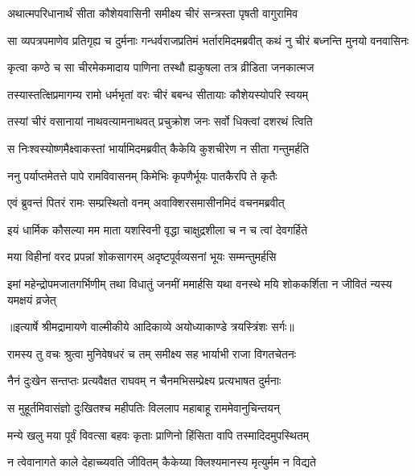\twolineshloka
{अथात्मपरिधानार्थं सीता कौशेयवासिनी}
{समीक्ष्य चीरं सन्त्रस्ता पृषती वागुरामिव} %

\threelineshloka
{सा व्यपत्रपमाणेव प्रतिगृह्य च दुर्मनाः}
{गन्धर्वराजप्रतिमं भर्तारमिदमब्रवीत्}
{कथं नु चीरं बध्नन्ति मुनयो वनवासिनः} %

\twolineshloka
{कृत्वा कण्ठे च सा चीरमेकमादाय पाणिना}
{तस्थौ ह्यकुषला तत्र व्रीडिता जनकात्मज} %

\twolineshloka
{तस्यास्तत्क्षिप्रमागम्य रामो धर्मभृतां वरः}
{चीरं बबन्ध सीतायाः कौशेयस्योपरि स्वयम्} %

\twolineshloka
{तस्यां चीरं वसानायां नाथवत्यामनाथवत्}
{प्रचुक्रोश जनः सर्वो धिक्त्वां दशरथं त्विति} %

\twolineshloka
{स निःश्वस्योष्णमैक्ष्वाकस्तां भार्यामिदमब्रवीत्}
{कैकेयि कुशचीरेण न सीता गन्तुमर्हति} %

\twolineshloka
{ननु पर्याप्तमेतत्ते पापे रामविवासनम्}
{किमेभिः कृपणैर्भूयः पातकैरपि ते कृतैः} %

\twolineshloka
{एवं ब्रुवन्तं पितरं रामः सम्प्रस्थितो वनम्}
{अवाक्शिरसमासीनमिदं वचनमब्रवीत्} %

\twolineshloka
{इयं धार्मिक कौसल्या मम माता यशस्विनी}
{वृद्धा चाक्षुद्रशीला च न च त्वां देवगर्हिते} %

\twolineshloka
{मया विहीनां वरद प्रपन्नां शोकसागरम्}
{अदृष्टपूर्वव्यसनां भूयः सम्मन्तुमर्हसि} %

\fourlineindentedshloka
{इमां महेन्द्रोपमजातगर्भिणीम्}
{तथा विधातुं जनमीं ममार्हसि}
{यथा वनस्थे मयि शोककर्शिता}
{न जीवितं न्यस्य यमक्षयं व्रजेत्} %


{॥इत्यार्षे श्रीमद्रामायणे वाल्मीकीये आदिकाव्ये अयोध्याकाण्डे त्रयस्त्रिंशः सर्गः॥}


\twolineshloka
{रामस्य तु वचः श्रुत्वा मुनिवेषधरं च तम्}
{समीक्ष्य सह भार्याभी राजा विगतचेतनः} %

\twolineshloka
{नैनं दुःखेन सन्तप्तः प्रत्यवैक्षत राघवम्}
{न चैनमभिसम्प्रेक्ष्य प्रत्यभाषत दुर्मनाः} %

\twolineshloka
{स मुहूर्तमिवासंज्ञो दुःखितश्च महीपतिः}
{विललाप महाबाहू राममेवानुचिन्तयन्} %

\twolineshloka
{मन्ये खलु मया पूर्वं विवत्सा बहवः कृताः}
{प्राणिनो हिंसिता वापि तस्मादिदमुपस्थितम्} %

\twolineshloka
{न त्वेवानागते काले देहाच्च्यवति जीवितम्}
{कैकेय्या क्लिश्यमानस्य मृत्युर्मम न विद्यते} %

